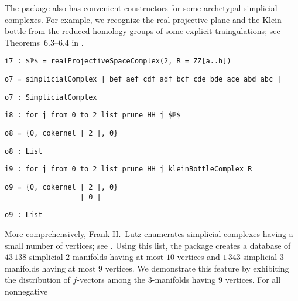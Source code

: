 \documentclass[12pt,leqno]{amsart}
\theoremstyle{definition}
\begin{document}
The package also has convenient constructors for some archetypal simplicial
complexes. For example, we recognize the real projective plane
and the Klein bottle from the reduced homology groups of some explicit
traingulations; see Theorems~6.3--6.4 in \cite{Munkres}.
\begin{lstlisting}[xleftmargin=10pt, lineskip=-5pt, aboveskip=3.0pt, belowskip=1.5pt]
i7 : $ℙ$ = realProjectiveSpaceComplex(2, R = ZZ[a..h])
\end{lstlisting}
\begin{lstlisting}[xleftmargin=10pt, aboveskip=1.5pt, belowskip=1.5pt]
o7 = simplicialComplex | bef aef cdf adf bcf cde bde ace abd abc |
\end{lstlisting}
\begin{lstlisting}[xleftmargin=10pt, aboveskip=1.5pt, belowskip=1.5pt]
o7 : SimplicialComplex
\end{lstlisting}
\begin{lstlisting}[xleftmargin=10pt, aboveskip=1.5pt, belowskip=1.5pt]
i8 : for j from 0 to 2 list prune HH_j $ℙ$
\end{lstlisting}
\begin{lstlisting}[xleftmargin=10pt, aboveskip=1.5pt, belowskip=1.5pt]
o8 = {0, cokernel | 2 |, 0}
\end{lstlisting}
\begin{lstlisting}[xleftmargin=10pt, aboveskip=1.5pt, belowskip=1.5pt]
o8 : List
\end{lstlisting}
\begin{lstlisting}[xleftmargin=10pt, aboveskip=1.5pt, belowskip=1.5pt]
i9 : for j from 0 to 2 list prune HH_j kleinBottleComplex R
\end{lstlisting}
\begin{lstlisting}[xleftmargin=10pt, lineskip=-10pt, aboveskip=4pt, belowskip=1.5pt]
o9 = {0, cokernel | 2 |, 0}
                  | 0 |
\end{lstlisting}
\begin{lstlisting}[xleftmargin=10pt, aboveskip=-5pt, belowskip=3.0pt]
o9 : List
\end{lstlisting}
More comprehensively, Frank H.~Lutz enumerates simplicial complexes having a
small number of vertices; see \cite{LutzM}.  Using this list, the package
creates a database of $43\,138$ simplicial $2$\nobreakdash-manifolds having at
most $10$ vertices and $1\,343$ simplicial $3$-manifolds having at most $9$
vertices.  We demonstrate this feature by exhibiting the distribution of
$f\!$-vectors among the $3$-manifolds having $9$ vertices.  For all nonnegative
\end{document}
